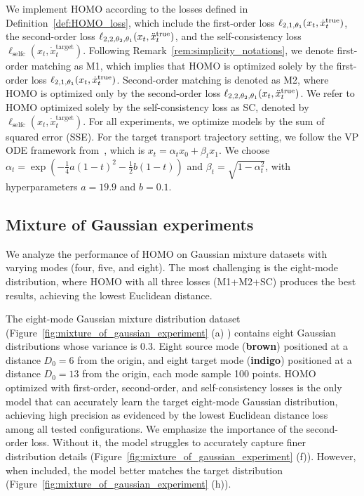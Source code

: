We implement HOMO according to the losses defined in Definition~\ref{def:HOMO_loss}, which include the first-order loss $\ell_{2,1,\theta_1}(x_t, \dot{x}_t^{\mathrm{true}})$, the second-order loss $\ell_{2,2,\theta_2, \theta_1}(x_t, \ddot{x}_t^{\mathrm{true}})$, and the self-consistency loss $\ell_{\mathrm{selfc}}(x_t, \dot{x}_t^{\mathrm{target}})$. 
Following Remark~\ref{rem:simplicity_notations}, we denote first-order matching as M1, which implies that HOMO is optimized solely by the first-order loss $\ell_{2,1,\theta_1}(x_t, \dot{x}_t^{\mathrm{true}})$. Second-order matching is denoted as M2, where HOMO is optimized only by the second-order loss $\ell_{2,2,\theta_2, \theta_1}(x_t, \ddot{x}_t^{\mathrm{true}})$. We refer to HOMO optimized solely by the self-consistency loss as SC, denoted by $\ell_{\mathrm{selfc}}(x_t, \dot{x}_t^{\mathrm{target}})$.
For all experiments, we optimize models by the sum of squared error (SSE). 
For the target transport trajectory setting, we follow the VP ODE framework from~\cite{rectified_flow}, which is $x_t = \alpha_t x_0 + \beta_t x_1$. We choose $\alpha_t = \exp(-\frac{1}{4} a(1-t)^2 - \frac{1}{2} b(1-t))$ and $\beta_t = \sqrt{1 - \alpha_t^2}$, with hyperparameters $a = 19.9$ and $b = 0.1$.


\subsection{Mixture of Gaussian experiments} \label{sec:results_and_analysis}

We analyze the performance of HOMO on Gaussian mixture datasets \cite{lssz24_gm} with varying modes (four, five, and eight). The most challenging is the eight-mode distribution, where HOMO with all three losses (M1+M2+SC) produces the best results, achieving the lowest Euclidean distance.

The eight-mode Gaussian mixture distribution dataset (Figure~\ref{fig:mixture_of_gaussian_experiment} (a) ) contains eight Gaussian distributions whose variance is $0.3$. 
Eight source mode (\textbf{brown}) positioned at a distance $D_0 = 6$ from the origin, and eight target mode (\textbf{indigo}) positioned at a distance $D_0 = 13$ from the origin, each mode sample 100 points. 
HOMO optimized with first-order, second-order, and self-consistency losses is the only model that can accurately learn the target eight-mode Gaussian distribution, achieving high precision as evidenced by the lowest Euclidean distance loss among all tested configurations.
We emphasize the importance of the second-order loss. Without it, the model struggles to accurately capture finer distribution details (Figure~\ref{fig:mixture_of_gaussian_experiment} (f)). However, when included, the model better matches the target distribution (Figure~\ref{fig:mixture_of_gaussian_experiment} (h)).


